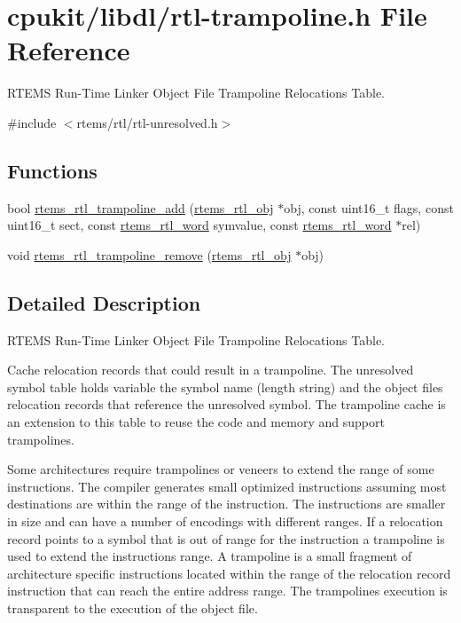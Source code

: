 \hypertarget{rtl-trampoline_8h}{}\section{cpukit/libdl/rtl-\/trampoline.h File Reference}
\label{rtl-trampoline_8h}


R\+T\+E\+MS Run-\/\+Time Linker Object File Trampoline Relocations Table.  


{\ttfamily \#include $<$rtems/rtl/rtl-\/unresolved.\+h$>$}\newline
\subsection*{Functions}
\begin{DoxyCompactItemize}
\item 
bool \mbox{\hyperlink{rtl-trampoline_8h_a996f6ce5f419e92e3d4b00093da4320e}{rtems\+\_\+rtl\+\_\+trampoline\+\_\+add}} (\mbox{\hyperlink{structrtems__rtl__obj}{rtems\+\_\+rtl\+\_\+obj}} $\ast$obj, const uint16\+\_\+t flags, const uint16\+\_\+t sect, const \mbox{\hyperlink{rtl-unresolved_8h_a5ab1ca8c94e49686f84f5ccf0731f0e6}{rtems\+\_\+rtl\+\_\+word}} symvalue, const \mbox{\hyperlink{rtl-unresolved_8h_a5ab1ca8c94e49686f84f5ccf0731f0e6}{rtems\+\_\+rtl\+\_\+word}} $\ast$rel)
\item 
void \mbox{\hyperlink{rtl-trampoline_8h_a962fc939ba38c1794ff7acdb15cdfa16}{rtems\+\_\+rtl\+\_\+trampoline\+\_\+remove}} (\mbox{\hyperlink{structrtems__rtl__obj}{rtems\+\_\+rtl\+\_\+obj}} $\ast$obj)
\end{DoxyCompactItemize}


\subsection{Detailed Description}
R\+T\+E\+MS Run-\/\+Time Linker Object File Trampoline Relocations Table. 

Cache relocation records that could result in a trampoline. The unresolved symbol table holds variable the symbol name (length string) and the object file\textquotesingle{}s relocation records that reference the unresolved symbol. The trampoline cache is an extension to this table to reuse the code and memory and support trampolines.

Some architectures require trampolines or veneers to extend the range of some instructions. The compiler generates small optimized instructions assuming most destinations are within the range of the instruction. The instructions are smaller in size and can have a number of encodings with different ranges. If a relocation record points to a symbol that is out of range for the instruction a trampoline is used to extend the instruction\textquotesingle{}s range. A trampoline is a small fragment of architecture specific instructions located within the range of the relocation record instruction that can reach the entire address range. The trampoline\textquotesingle{}s execution is transparent to the execution of the object file.

